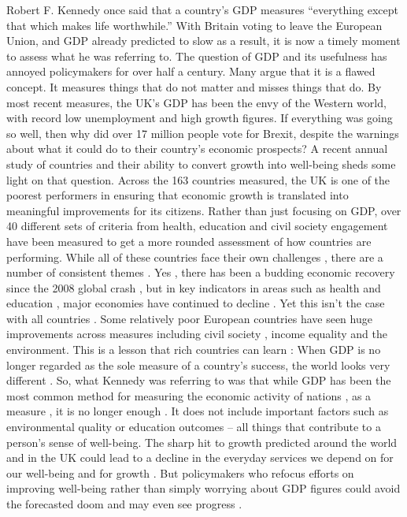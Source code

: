 Robert F. Kennedy once said that a country’s GDP measures “everything except that which makes life worthwhile.” With Britain voting to leave the European Union, and GDP already predicted to slow as a result, it is now a timely moment to assess what he was referring to. 
The question of GDP and its usefulness has annoyed policymakers for over half a century. Many argue that it is a flawed concept. It measures things that do not matter and misses things that do. By most recent measures, the UK’s GDP has been the envy of the Western world, with record low unemployment and high growth figures. If everything was going so well, then why did over 17 million people vote for Brexit, despite the warnings about what it could do to their country’s economic prospects? 
A recent annual study of countries and their ability to convert growth into well-being sheds some light on that question. Across the 163 countries measured, the UK is one of the poorest performers in ensuring that economic growth is translated into meaningful improvements for its citizens. Rather than just focusing on GDP, over 40 different sets of criteria from health, education and civil society engagement have been measured to get a more rounded assessment of how countries are performing. 
While all of these countries face their own challenges , there are a number of consistent themes . Yes , there has been a budding economic recovery since the 2008 global crash , but in key indicators in areas such as health and education , major economies have continued to decline . Yet this isn’t the case with all countries . Some relatively poor European countries have seen huge improvements across measures including civil society , income equality and the environment. 
This is a lesson that rich countries can learn : When GDP is no longer regarded as the sole measure of a country’s success, the world looks very different . 
So, what Kennedy was referring to was that while GDP has been the most common method for measuring the economic activity of nations , as a measure , it is no longer enough . It does not include important factors such as environmental quality or education outcomes – all things that contribute to a person’s sense of well-being. 
The sharp hit to growth predicted around the world and in the UK could lead to a decline in the everyday services we depend on for our well-being and for growth . But policymakers who refocus efforts on improving well-being rather than simply worrying about GDP figures could avoid the forecasted doom and may even see progress . 
